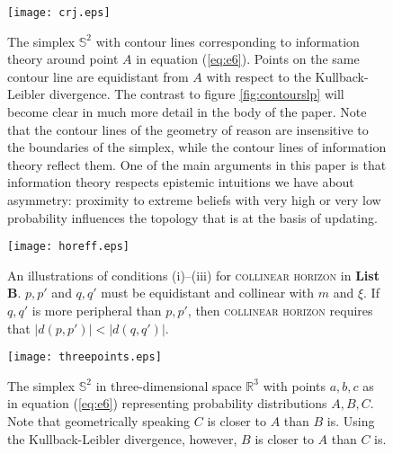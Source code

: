 \documentclass[smallextended]{svjour3}       %
\begin{document}
\begin{figure}[ht]
  \begin{flushright}
    \begin{minipage}[h]{.7\linewidth}
      \texttt{[image: crj.eps]}
      \caption{\footnotesize The simplex $\mathbb{S}^{2}$ with contour
        lines corresponding to information theory around point $A$ in
        equation (\ref{eq:e6}). Points on the same contour line are
        equidistant from $A$ with respect to the Kullback-Leibler
        divergence. The contrast to figure \ref{fig:contourslp} will
        become clear in much more detail in the body of the paper.
        Note that the contour lines of the geometry of reason are
        insensitive to the boundaries of the simplex, while the
        contour lines of information theory reflect them. One of the
        main arguments in this paper is that information theory
        respects epistemic intuitions we have about asymmetry:
        proximity to extreme beliefs with very high or very low
        probability influences the topology that is at the basis of
        updating.}
      \label{fig:contoursrj}
    \end{minipage}
  \end{flushright}
\end{figure}

\begin{figure}[ht]
  \begin{flushright}
    \begin{minipage}[h]{.7\linewidth}
      \texttt{[image: horeff.eps]}
      \caption{\footnotesize An illustrations of conditions (i)--(iii)
        for \textsc{collinear horizon} in \textbf{List B}. $p,p'$ and $q,q'$
        must be equidistant and collinear with $m$ and $\xi$. If
        $q,q'$ is more peripheral than $p,p'$, then \textsc{collinear
          horizon} requires that $|d(p,p')|<|d(q,q')|$.}
      \label{fig:conditions}
    \end{minipage}
  \end{flushright}
\end{figure}

\begin{figure}[ht]
  \begin{flushright}
    \begin{minipage}[h]{.7\linewidth}
      \texttt{[image: threepoints.eps]}
      \caption{\footnotesize The simplex $\mathbb{S}^{2}$ in
        three-dimensional space $\mathbb{R}^{3}$ with points $a,b,c$
        as in equation (\ref{eq:e6}) representing probability
        distributions $A,B,C$. Note that geometrically speaking $C$ is
        closer to $A$ than $B$ is. Using the Kullback-Leibler
        divergence, however, $B$ is closer to $A$ than $C$ is.}
      \label{fig:threepoints}
    \end{minipage}
  \end{flushright}
\end{figure}
\end{document}
